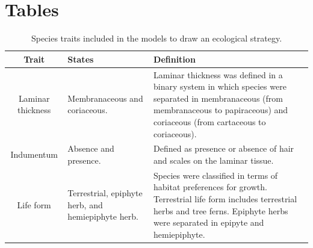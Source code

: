 \documentclass[12pt]{article}
\begin{document}



\newpage 


\section*{Tables}


\begin{table}[!hb]
    \caption{ Species traits included in the models to draw an ecological strategy.}\label{trait}
  \begin{tabular}{cp{4cm}p{6cm}}
 \toprule	
\bf{Trait}	&	\bf{States}	&	\bf{Definition} 	\\
\hline
Laminar thickness	&	Membranaceous and coriaceous.	&	Laminar thickness was defined in a binary system in which species were separated in membranaceous (from membranaceous to papiraceous) and coriaceous (from cartaceous to coriaceous).	 \\
Indumentum	&	Absence and presence.	&	Defined as presence or absence of hair and scales on the laminar tissue.  \\
Life form	&	Terrestrial, epiphyte herb, and hemiepiphyte herb.	&	Species were classified in terms of habitat preferences for growth. Terrestrial life form includes terrestrial herbs and tree ferns. Epiphyte herbs were separated in epipyte and hemiepiphyte. \\
\bottomrule
\end{tabular}
\end{table}


\newpage
\end{document}

